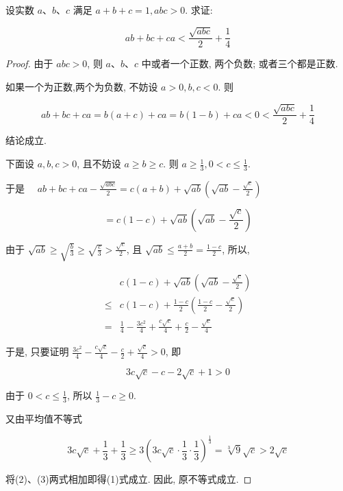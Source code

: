 \begin{example}
	设实数 $a 、 b 、 c$ 满足 $a+b+c=1, a b c>0$. 求证:
	
	$$
	a b+b c+c a<\frac{\sqrt{a b c}}{2}+\frac{1}{4}
	$$
\end{example}
\begin{proof}
	由于 $a b c>0$, 则 $a 、 b 、 c$ 中或者一个正数, 两个负数; 或者三个都是正数.
	
	如果一个为正数,两个为负数, 不妨设 $a>0, b, c<0$. 则
	
	$$
	a b+b c+c a=b(a+c)+c a=b(1-b)+c a<0<\frac{\sqrt{a b c}}{2}+\frac{1}{4}
	$$
	
	结论成立.
	
	下面设 $a, b, c>0$, 且不妨设 $a \geqslant b \geqslant c$. 则 $a \geqslant \frac{1}{3}, 0<c \leqslant \frac{1}{3}$.
	
	于是 $\quad a b+b c+c a-\frac{\sqrt{a b c}}{2}=c(a+b)+\sqrt{a b}\left(\sqrt{a b}-\frac{\sqrt{c}}{2}\right)$
	
	$$
	=c(1-c)+\sqrt{a b}\left(\sqrt{a b}-\frac{\sqrt{c}}{2}\right)
	$$
	
	由于 $\sqrt{a b} \geqslant \sqrt{\frac{b}{3}} \geqslant \sqrt{\frac{c}{3}}>\frac{\sqrt{c}}{2}$, 且 $\sqrt{a b} \leqslant \frac{a+b}{2}=\frac{1-c}{2}$, 所以,
	
	$$
	\begin{aligned}
	& c(1-c)+\sqrt{a b}\left(\sqrt{a b}-\frac{\sqrt{c}}{2}\right) \\
	\leqslant & c(1-c)+\frac{1-c}{2}\left(\frac{1-c}{2}-\frac{\sqrt{c}}{2}\right) \\
	= & \frac{1}{4}-\frac{3 c^{2}}{4}+\frac{c \sqrt{c}}{4}+\frac{c}{2}-\frac{\sqrt{c}}{4}
	\end{aligned}
	$$
	
	于是, 只要证明 $\frac{3 c^{2}}{4}-\frac{c \sqrt{c}}{4}-\frac{c}{2}+\frac{\sqrt{c}}{4}>0$, 即
	
	
	\begin{equation*}
	3 c \sqrt{c}-c-2 \sqrt{c}+1>0 \tag{1}
	\end{equation*}
	
	
	由于 $0<c \leqslant \frac{1}{3}$, 所以 $\frac{1}{3}-c \geqslant 0$.
	
	又由平均值不等式
	
	
	\begin{equation*}
	3 c \sqrt{c}+\frac{1}{3}+\frac{1}{3} \geqslant 3\left(3 c \sqrt{c} \cdot \frac{1}{3} \cdot \frac{1}{3}\right)^{\frac{1}{3}}=\sqrt[3]{9} \sqrt{c}>2 \sqrt{c} \tag{3}
	\end{equation*}
	
	
	将(2)、(3)两式相加即得(1)式成立. 因此, 原不等式成立.
\end{proof}
